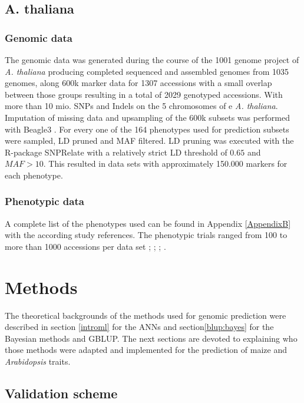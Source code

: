 \subsection{A. thaliana}

\subsubsection{Genomic data}

The genomic data was generated during the course of the 1001 genome project of \textit{A. thaliana}
\cite{1001genome} producing completed sequenced and assembled genomes from 1035 genomes, along 600k marker
data for 1307 accessions with a small overlap between those groups resulting in a total of 2029 genotyped
accessions. With more than 10 mio. SNPs and Indels on the 5 chromosomes of e \textit{A. thaliana}. Imputation
of missing data and upsampling of the 600k subsets was performed with Beagle3 \cite{browning2007rapid}.  For
every one of the 164 phenotypes used for prediction subsets were sampled, LD pruned and MAF filtered. LD
pruning was executed with the R-package SNPRelate \cite{zheng2013tutorial} with a relatively strict LD
threshold of $0.65$ and $MAF > 10 $. This resulted in data sets with approximately 150.000 markers for each
phenotype.

\subsubsection{Phenotypic data}
A complete list of the phenotypes used can be found in Appendix \ref{AppendixB} with the according study
references.  The phenotypic trials ranged from 100 to more than 1000 accessions per data set \cite{atwell2010}; \cite{li2010}; \cite{strauch2015}; \cite{me2014}.


\section{Methods}

The theoretical backgrounds of the methods used for genomic prediction were described in section \ref{introml}
for the ANNs and section\ref{blup:bayes} for the Bayesian methods and GBLUP. The next sections are devoted to
explaining who those methods were adapted and implemented for the prediction of maize and \textit{Arabidopsis}
traits.

\subsection{Validation scheme} \label{cv}

